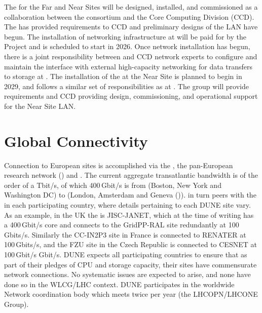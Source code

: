 \documentclass[../main-v1.tex]{subfiles}
\begin{document}
The  for the Far and Near Sites will be designed, installed, and commissioned as a collaboration between the   %
consortium and the  Core Computing Division (CCD). The  has provided requirements to CCD and preliminary designs of the LAN have begun. The installation of networking infrastructure at  will be paid for by the %
 Project 
and is scheduled to start in %
2026. Once network installation has begun, there is a joint responsibility between  and CCD network experts to configure and maintain the interface with external high-capacity networking for data transfers to storage at . The installation of the  at the Near Site is planned to begin in %
2029, and follows a similar set of responsibilities as at . The  group will provide requirements and CCD providing design, commissioning, and operational support for the Near Site LAN.

\section{Global Connectivity}
Connection to European sites is accomplished via the ,
the pan-European research network () and .
The current aggregate  transatlantic bandwidth is of the order of a Tbit/s, of which 400\,Gbit/s is from   (Boston, New York and Washington DC)
to  (London, Amsterdam and Geneva ()).
 in turn peers with the    in each participating country, where details
pertaining to each DUNE site vary. As an example, in the UK the
 is JISC-JANET, which at the time of writing has a 400\,Gbit/s core and connects to the GridPP-RAL site redundantly at 100\,Gbits/s.
Similarly the CC-IN2P3 site in France is connected to RENATER at 100\,Gbits/s, and the FZU site in the Czech Republic is connected to CESNET
at 100\,Gbit/s Gbit/s.  DUNE expects all participating countries to
ensure that as part of their pledges of CPU and storage capacity, %
their sites %
have commensurate network connections. %
No systematic issues are expected to arise, and none have done so in the
WLCG/LHC context. DUNE participates in the worldwide  Network
coordination body which meets twice per year  (the LHCOPN/LHCONE Group).
\end{document}
